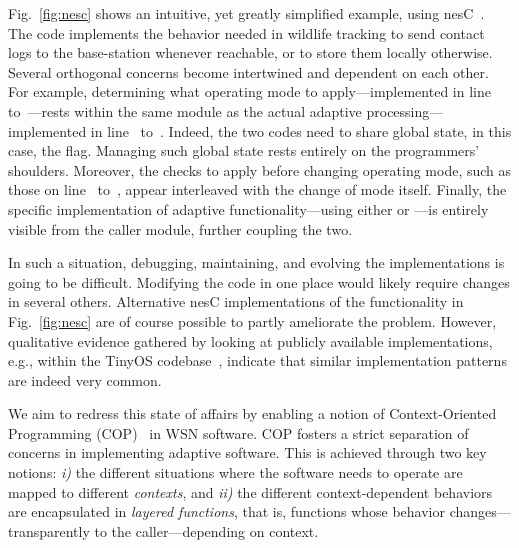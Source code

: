 
Fig.~\ref{fig:nesc} shows an intuitive, yet greatly simplified
example, using nesC~\cite{gay03nesc}. The code implements the behavior
needed in wildlife tracking to send contact logs to the base-station
whenever reachable, or to store them locally otherwise. Several
orthogonal concerns become intertwined and dependent on each
other. For example, determining what operating mode to
apply---implemented in line~
to~---rests within the same module as the actual
adaptive processing---implemented in line~
to~. Indeed, the two codes need to share global state,
in this case, the  flag. Managing such
global state rests entirely on the programmers' shoulders. Moreover,
the checks to apply before changing operating mode, such as those on
line~ to~, appear interleaved with the
change of mode itself. Finally, the specific implementation of
adaptive functionality---using either  or
---is entirely visible from the caller module,
further coupling the two.

In such a situation, debugging, maintaining, and evolving the
implementations is going to be difficult. Modifying the code in one
place would likely require changes in several others. Alternative nesC
implementations of the functionality in Fig.~\ref{fig:nesc} are of
course possible to partly ameliorate the problem. However, qualitative
evidence gathered by looking at publicly available implementations,
e.g., within the TinyOS codebase~\cite{tinyos}, indicate that similar
implementation patterns are indeed very common.


 We aim to redress this state of
affairs by enabling a notion of Context-Oriented Programming
(COP)~\cite{Hirschfeld08} in WSN software. COP fosters a strict
separation of concerns in implementing adaptive software. This is
achieved through two key notions: \emph{i)} the different situations
where the software needs to operate are mapped to different
\emph{contexts}, and \emph{ii)} the different context-dependent
behaviors are encapsulated in \emph{layered functions}, that
is, functions whose behavior changes---transparently to the
caller---depending on context.

